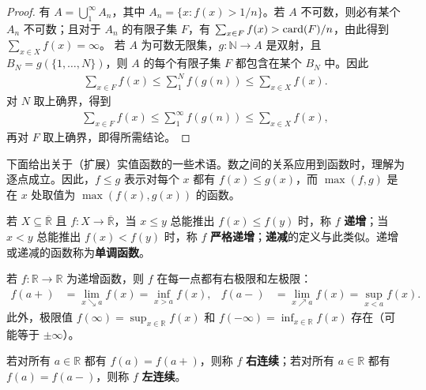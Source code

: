 \documentclass[../../main.tex]{subfiles}%
\begin{document}
\begin{proof}
有 $A=\bigcup_{1}^{\infty}A_n$，其中 $A_n=\{x:f(x)>1/n\}$。若 $A$ 不可数，则必有某个 $A_n$ 不可数；且对于 $A_n$ 的有限子集 $F$，有 $\sum_{x\in F}f(x)>\operatorname{card}(F)/n$，由此得到 $\sum_{x\in X}f(x)=\infty$。
若 $A$ 为可数无限集，$g:\mathbb{N}\to A$ 是双射，且 $B_N=g(\{1,\ldots,N\})$，则 $A$ 的每个有限子集 $F$ 都包含在某个 $B_N$ 中。因此
\begin{align*}
\sum_{x\in F}f(x)\leqslant\sum_{1}^{N}f(g(n))\leqslant\sum_{x\in X}f(x).
\end{align*}
对 $N$ 取上确界，得到
\begin{align*}
\sum_{x\in F}f(x)\leqslant\sum_{1}^{\infty}f(g(n))\leqslant\sum_{x\in X}f(x),
\end{align*}
再对 $F$ 取上确界，即得所需结论。
\end{proof}

下面给出关于（扩展）实值函数的一些术语。数之间的关系应用到函数时，理解为逐点成立。因此，$f\leqslant g$ 表示对每个 $x$ 都有 $f(x)\leqslant g(x)$，而 $\max(f,g)$ 是在 $x$ 处取值为 $\max(f(x),g(x))$ 的函数。
\begin{definition}[单调函数]\label{definition:ch00-monotone-functions}
若 $X\subseteq\overline{\mathbb{R}}$ 且 $f:X\to\overline{\mathbb{R}}$，当 $x\leqslant y$ 总能推出 $f(x)\leqslant f(y)$ 时，称 $f$ \textbf{递增}；当 $x<y$ 总能推出 $f(x)<f(y)$ 时，称 $f$ \textbf{严格递增}；\textbf{递减}的定义与此类似。递增或递减的函数称为\textbf{单调函数}。
\end{definition}



\begin{proposition}\label{proposition:ch00-one-sided-limits}
若 $f:\mathbb{R}\to\mathbb{R}$ 为递增函数，则 $f$ 在每一点都有右极限和左极限：
\begin{align*}
f(a+)&=\lim_{x\searrow a}f(x)=\inf_{x>a}f(x),&
f(a-)&=\lim_{x\nearrow a}f(x)=\sup_{x<a}f(x).
\end{align*}
此外，极限值 $f(\infty)=\sup_{x\in\mathbb{R}}f(x)$ 和 $f(-\infty)=\inf_{x\in\mathbb{R}}f(x)$ 存在（可能等于 $\pm\infty$）。
\end{proposition}

\begin{definition}[右连续与左连续]\label{definition:ch00-one-sided-continuity}
若对所有 $a\in\mathbb{R}$ 都有 $f(a)=f(a+)$，则称 $f$ \textbf{右连续}；若对所有 $a\in\mathbb{R}$ 都有 $f(a)=f(a-)$，则称 $f$ \textbf{左连续}。
\end{definition}
\end{document}
